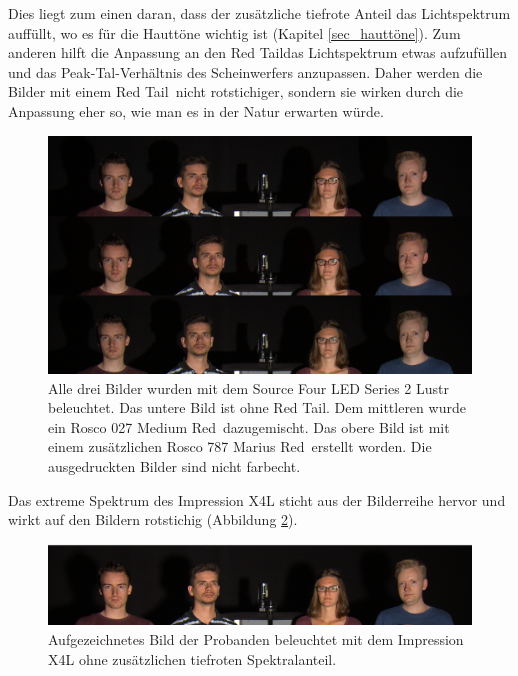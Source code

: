 Dies liegt zum einen daran, dass der zusätzliche tiefrote Anteil das Lichtspektrum auffüllt, wo es für die Hauttöne wichtig ist (Kapitel \ref{sec_hauttöne}).
Zum anderen hilft die Anpassung an den \glqq Red Tail\grqq  das Lichtspektrum etwas aufzufüllen und das Peak-Tal-Verhältnis des Scheinwerfers anzupassen. Daher werden die Bilder mit einem \glqq Red Tail\grqq\ nicht rotstichiger, sondern sie wirken durch die Anpassung eher so, wie man es in der Natur erwarten würde.

\begin{figure}[H]     %
\centering
\includegraphics[width=1.0\textwidth]{bilder/vergleich} 
\caption {Alle drei Bilder wurden mit dem Source Four LED Series 2 Lustr beleuchtet. Das untere Bild ist ohne \glqq Red Tail\grqq . Dem mittleren wurde ein Rosco 027 \glqq Medium Red\grqq\ dazugemischt. Das obere Bild ist mit einem zusätzlichen Rosco 787 \glqq Marius Red\grqq\ erstellt worden. Die ausgedruckten Bilder sind nicht farbecht.} \label{b_vergleich}
\end{figure}

Das extreme Spektrum des Impression X4L sticht aus der Bilderreihe hervor und wirkt auf den Bildern rotstichig (Abbildung \ref{b_umfrageglpbild}). 

\begin{figure}[H]     %
\centering
\includegraphics[width=1.0\textwidth]{bilder/umfrageglpbild} 
\caption {Aufgezeichnetes Bild der Probanden beleuchtet mit dem Impression X4L ohne zusätzlichen tiefroten Spektralanteil.} \label{b_umfrageglpbild}
\end{figure}

